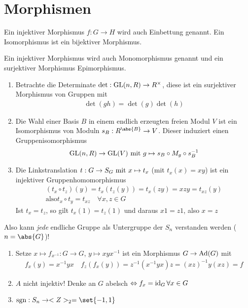 \section{Morphismen}
\begin{definition}
	Ein injektiver Morphismus $f: G \to H$ wird auch Einbettung genannt. Ein Isomorphismus ist ein bijektiver Morphismus.
\end{definition}
\begin{*remark}
	Ein injektiver Morphismus wird auch Monomorphismus genannt und ein surjektiver Morphismus Epimorphismus.
\end{*remark}
\begin{example}
	\begin{enumerate}
		\item Betrachte die Determinate $\det: \GL(n,R) \to R^{\times}$, diese ist ein surjektiver Morphismus von Gruppen mit
		\begin{align*}
		\det(gh) = \det(g)\det(h)
		\end{align*}
		\item Die Wahl einer Basis $B$ in einem endlich erzeugten freien Modul $V$ ist ein Isomorphismus von Moduln $s_B: R^{\abs{B}} \to V$. Dieser induziert einen Gruppenisomorphismus
		\begin{align*}
			\GL(n,R) \to \GL(V) \mit g \mapsto s_B \circ M_g \circ s^{-1}_B
		\end{align*}
		\item Die Linkstranslation $t: G \to S_G \mit x \mapsto t_x$ (mit $t_x(x) = xy$) ist ein injektiver Gruppenhomomorphismus
		\begin{align*}
			(t_x \circ t_z)(y) = t_x(t_z (y))=t_x(zy) = xzy = t_{xz}(y)\\
			\text{also} t_x \circ t_y = t_{xz} \quad \forall x,z \in G
		\end{align*}
		Ist $t_x = t_z$, so gilt $t_x(1) = t_z(1)$ und daraus $x1=z1$, also $x=z$
	\end{enumerate}
	Also kann \emph{jede} endliche Gruppe als Untergruppe der $S_n$ verstanden werden ($n = \abs{G}$)!
\end{example}
\begin{example}
	\begin{enumerate}
		\item Setze $x \mapsto f_{x^{-1}}: G \to G$, $y \mapsto xyx^{-1}$ ist ein Morphismus $G \to \Ad(G)$ mit
		\begin{align*}
		f_x(y) = x^{-1}yx \quad f_z(f_x(y)) = z^{-1}(x^{-1}yx)z = (xz)^{-1}y(xz) = f
		\end{align*}
		\item $A$ nicht injektiv! Denke an $G$ abelsch $\Leftrightarrow f_x = \id_G \forall x \in G$
		\item $\sgn: S_n \to \Z_2 = \set{-1,1}$
	\end{enumerate}
\end{example}